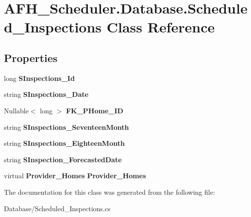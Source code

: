 \section{A\+F\+H\+\_\+\+Scheduler.\+Database.\+Scheduled\+\_\+\+Inspections Class Reference}
\label{class_a_f_h___scheduler_1_1_database_1_1_scheduled___inspections}
\subsection*{Properties}
\begin{DoxyCompactItemize}
\item 
\mbox{\label{class_a_f_h___scheduler_1_1_database_1_1_scheduled___inspections_af0abc2e0c7ab5d0eeedf409e1d7c5fdd}} 
long {\bfseries S\+Inspections\+\_\+\+Id}\hspace{0.3cm}{\ttfamily  [get, set]}
\item 
\mbox{\label{class_a_f_h___scheduler_1_1_database_1_1_scheduled___inspections_a500d6eb40626e28274c69ef58c11d430}} 
string {\bfseries S\+Inspections\+\_\+\+Date}\hspace{0.3cm}{\ttfamily  [get, set]}
\item 
\mbox{\label{class_a_f_h___scheduler_1_1_database_1_1_scheduled___inspections_acd24cdd1b5ce898a1733aefa90b331d0}} 
Nullable$<$ long $>$ {\bfseries F\+K\+\_\+\+P\+Home\+\_\+\+ID}\hspace{0.3cm}{\ttfamily  [get, set]}
\item 
\mbox{\label{class_a_f_h___scheduler_1_1_database_1_1_scheduled___inspections_a96aa6cfe7d59bfa732bd27838a78c8ce}} 
string {\bfseries S\+Inspections\+\_\+\+Seventeen\+Month}\hspace{0.3cm}{\ttfamily  [get, set]}
\item 
\mbox{\label{class_a_f_h___scheduler_1_1_database_1_1_scheduled___inspections_a325fcf198404d864200b79fcc2ca7e05}} 
string {\bfseries S\+Inspections\+\_\+\+Eighteen\+Month}\hspace{0.3cm}{\ttfamily  [get, set]}
\item 
\mbox{\label{class_a_f_h___scheduler_1_1_database_1_1_scheduled___inspections_a698f4f614b1b1971bdc58216fb2a1b47}} 
string {\bfseries S\+Inspection\+\_\+\+Forecasted\+Date}\hspace{0.3cm}{\ttfamily  [get, set]}
\item 
\mbox{\label{class_a_f_h___scheduler_1_1_database_1_1_scheduled___inspections_a679478c41a57cd271d52d1f6393befd2}} 
virtual \textbf{ Provider\+\_\+\+Homes} {\bfseries Provider\+\_\+\+Homes}\hspace{0.3cm}{\ttfamily  [get, set]}
\end{DoxyCompactItemize}


The documentation for this class was generated from the following file\+:\begin{DoxyCompactItemize}
\item 
Database/Scheduled\+\_\+\+Inspections.\+cs\end{DoxyCompactItemize}
